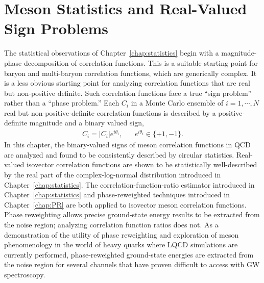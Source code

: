 \chapter{Meson Statistics and Real-Valued Sign Problems}\label{chap:mesons}
 
%

The statistical observations of Chapter~\ref{chap:statistics} begin with a magnitude-phase decomposition of correlation functions.
This is a suitable starting point for baryon and multi-baryon correlation functions, which are generically complex.
It is a less obvious starting point for analyzing correlation functions that are real but non-positive definite.
Such correlation functions face a true ``sign problem'' rather than a ``phase problem.''
Each $C_i$ in a Monte Carlo ensemble of $i=1,\cdots,N$ real but non-positive-definite correlation functions is described by a positive-definite magnitude and a binary valued sign,
\begin{equation}
  \begin{split}
    C_i = |C_i|e^{i\theta_i},\hspace{20pt} e^{i\theta_i} \in \{+1,-1\}.
  \end{split}\label{eq:binary}
\end{equation}
In this chapter, the binary-valued signs of meson correlation functions in QCD are analyzed and found to be consistently described by circular statistics.
Real-valued isovector correlation functions are shown to be statistically well-described by the real part of the complex-log-normal distribution introduced in Chapter~\ref{chap:statistics}.
The correlation-function-ratio estimator introduced in Chapter~\ref{chap:statistics} and phase-reweighted techniques introduced in Chapter~\ref{chap:PR} are both applied to isovector meson correlation functions.
Phase reweighting allows precise ground-state energy results to be extracted from the noise region; analyzing correlation function ratios does not.
As a demonstration of the utility of phase reweighting and exploration of meson phenomenology in the world of heavy quarks where LQCD simulations are currently performed, phase-reweighted ground-state energies are extracted from the noise region for several channels that have proven difficult to access with GW spectroscopy.

